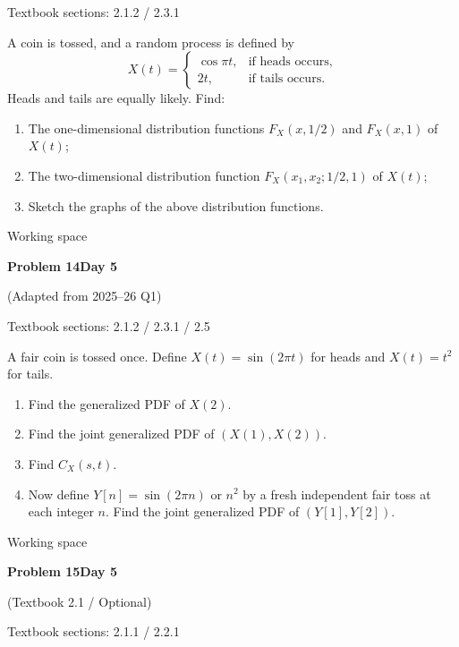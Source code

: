 \documentclass[11pt]{article}
\newcommand{\qtitle}[2]{\clearpage\begin{tcolorbox}[colback=navy,colframe=navy,arc=1.5pt,boxrule=0pt]\color{white}\large\bfseries #1\hfill\small #2\end{tcolorbox}}
\begin{document}
{\small\color{muted}Textbook sections: 2.1.2 / 2.3.1}\par\medskip
\begin{tcolorbox}[colback=qbg,colframe=qbg,boxrule=0pt]A coin is tossed, and a random process is defined by
\[
X(t)=\begin{cases}
\cos\pi t,&\text{if heads occurs},\\
2t,&\text{if tails occurs}.
\end{cases}
\]
Heads and tails are equally likely. Find:
\begin{enumerate}
\item The one-dimensional distribution functions $F_X(x,1/2)$ and $F_X(x,1)$ of $X(t)$;
\item The two-dimensional distribution function $F_X(x_1,x_2;1/2,1)$ of $X(t)$;
\item Sketch the graphs of the above distribution functions.
\end{enumerate}
\end{tcolorbox}\smallskip\begin{workspace}\hfill{\color{linec}\footnotesize Working space}\end{workspace}
\qtitle{Problem 14}{Day 5}
{\small\color{accentred}(Adapted from 2025--26 Q1)}\par\smallskip
{\small\color{muted}Textbook sections: 2.1.2 / 2.3.1 / 2.5}\par\medskip
\begin{tcolorbox}[colback=qbg,colframe=qbg,boxrule=0pt]A fair coin is tossed once. Define $X(t)=\sin(2\pi t)$ for heads and $X(t)=t^2$ for tails.
\begin{enumerate}\item Find the generalized PDF of $X(2)$.\item Find the joint generalized PDF of $(X(1),X(2))$.\item Find $C_X(s,t)$.\item Now define $Y[n]=\sin(2\pi n)$ or $n^2$ by a fresh independent fair toss at each integer $n$. Find the joint generalized PDF of $(Y[1],Y[2])$.\end{enumerate}
\end{tcolorbox}\smallskip\begin{workspace}\hfill{\color{linec}\footnotesize Working space}\end{workspace}
\qtitle{Problem 15}{Day 5}
{\small\color{accentred}(Textbook 2.1 / Optional)}\par\smallskip
{\small\color{muted}Textbook sections: 2.1.1 / 2.2.1}\par\medskip
\end{document}
